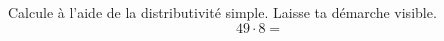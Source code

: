 %
%
    Calcule à l'aide de la distributivité simple. Laisse ta démarche visible.
    \[49 \cdot 8=\]
    \vspace{3cm}
